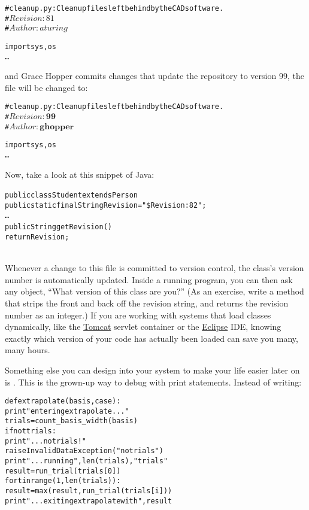\documentclass{report}
\begin{document}
\begin{alltt}
# cleanup.py : Clean up files left behind by the CAD software.
# $Revision: 81$
# $Author: aturing$

import sys, os
{\ldots}
\end{alltt}

\noindent and Grace Hopper commits changes that update the repository
to version 99, the file will be changed to:

\begin{alltt}
# cleanup.py : Clean up files left behind by the CAD software.
# $Revision: \textbf{99}$
# $Author: \textbf{ghopper}$

import sys, os
{\ldots}
\end{alltt}

Now, take a look at this snippet of Java:

\begin{alltt}
public class Student extends Person {
    public static final String Revision = "\$Revision: 82";
    {\ldots}
    public String getRevision() {
        return Revision;
    }
}
\end{alltt}

Whenever a change to this file is committed to version control, the
class's version number is automatically updated.  Inside a running
program, you can then ask any  object, ``What version of
this class are you?''  (As an exercise, write a method that strips the
front and back off the revision string, and returns the revision
number as an integer.)  If you are working with systems that load
classes dynamically, like the \url{Tomcat} servlet container or the
\url{Eclipse} IDE, knowing exactly which version of your code has
actually been loaded can save you many, many hours.


Something else you can design into your system to make your life
easier later on is .  This is the grown-up way to
debug with print statements.  Instead of writing:

\begin{alltt}
def extrapolate(basis, case):
    print "entering extrapolate..."
    trials = count_basis_width(basis)
    if not trials:
        print "...no trials!"
        raise InvalidDataException("no trials")
    print "...running", len(trials), "trials"
    result = run_trial(trials[0])
    for t in range(1, len(trials)):
        result = max(result, run_trial(trials[i]))
    print "...exiting extrapolate with", result
\end{alltt}
\end{document}
